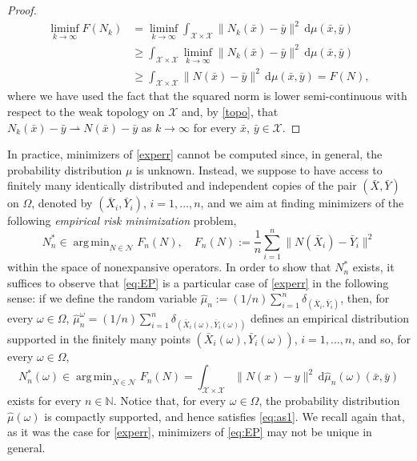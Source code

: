 \documentclass[onefignum,onetabnum]{siamonline250211}
\newcommand{\N}{\mathcal{N}}
\newcommand{\bx}{\bar{x}}
\newcommand{\by}{\bar{y}}
\newcommand{\bX}{\bar{X}}
\newcommand{\bY}{\bar{Y}}
\newcommand{\cX}{\mathcal{X}}
\DeclareMathOperator*{\argmin}{arg\,min}
\begin{document}
\begin{proof}
\begin{align*}
\liminf_{k\to\infty}F(N_k)&=\liminf_{k\to\infty}\int_{\cX\times\cX} \|N_k(\bar x)-\bar{y}\|^2 \, \mathrm{d}\mu(\bar x, \bar y)\\
&\geq \int_{\cX\times\cX} \liminf_{k\to\infty}\|N_k(\bar x)-\bar{y}\|^2 \, \mathrm{d}\mu(\bar x, \bar y)\\
    &\geq \int_{\cX\times\cX} \|N(\bar x)-\bar{y}\|^2 \, \mathrm{d}\mu(\bar x, \bar y)=F(N),
\end{align*}
where we have used the fact that the squared norm is lower semi-continuous with respect to the weak topology on $\cX$ and, by \cref{topo}, that $N_k(\bar x)-\bar{y}\rightharpoonup N(\bar x)-\bar{y}$ as $k\to\infty$ for every $\bar x$, $\bar{y}\in\cX$.
\end{proof}

In practice, minimizers of \cref{experr} cannot be computed since, in general, the probability distribution $\mu$ is unknown. Instead, we suppose to have access to finitely many identically distributed and independent copies of the pair $(\bar X, \bar Y)$ on $\Omega$, denoted by  $(\bar{X}_i,\bar{Y}_i)$, $i=1,\ldots, n$, and we aim at finding minimizers of the following \emph{empirical risk minimization} problem,
\begin{equation}\label{eq:EP}
\tag{EP}
N^*_n\in \argmin_{N\in\N}F_n(N), \quad F_n(N):=\frac{1}{n}\sum_{i=1}^n \|N(\bar{X}_i)-\bar{Y}_i\|^2
\end{equation}
within the space of nonexpansive operators. In order to show that $N_n^*$ exists, it suffices to observe that \cref{eq:EP} is a particular case of \cref{experr} in the following sense: if we define the random variable $\hat \mu_n:=(1/n)\sum_{i=1}^n\delta_{(\bX_i, \bY_i)}$, then, for every $\omega\in\Omega$, $\hat \mu_n^\omega=(1/n)\sum_{i=1}^n\delta_{(\bX_i(\omega), \bY_i(\omega))}$ defines an empirical distribution supported in the finitely many points $(\bX_i(\omega), \bY_i(\omega))$, $i=1,..., n$, and so, for every $\omega\in\Omega$,
$$
N_n^*(\omega)\in\argmin_{N\in\N} F_n(N)=\int_{\cX\times\cX} \|N(x)-y\|^2 \, \mathrm{d}\hat \mu_n(\omega)(\bx, \by)
$$
exists for every $n\in\mathbb{N}$. Notice that, for every $\omega\in\Omega$, the probability distribution $\hat{\mu}(\omega)$ is compactly supported, and hence satisfies \cref{eq:as1}. We recall again that, as it was the case for \eqref{experr}, minimizers of \eqref{eq:EP} may not be unique in general.
\end{document}
